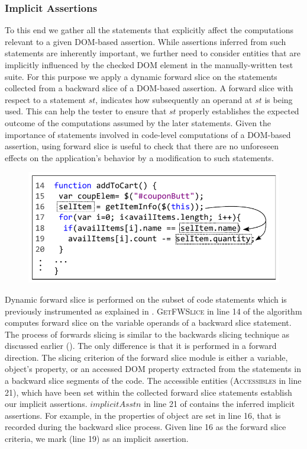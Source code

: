 \subsubsection{Implicit Assertions} \label{Sec:implicitAssertions}
To this end we gather all the statements that explicitly affect the computations relevant to a given DOM-based assertion. While assertions inferred from such statements are inherently important, we further need to consider entities that are implicitly influenced by the checked DOM element in the manually-written test suite. For this purpose we apply a dynamic forward slice on the statements collected from a backward slice of a DOM-based assertion. A forward slice with respect to a statement $st$,
indicates how subsequently an operand at $st$ is being used. This can help the tester to ensure that $st$ properly establishes the expected outcome of the computations assumed by the later statements. 
Given the importance of statements involved in code-level computations of a DOM-based assertion, using forward slice is useful to check that there are no unforeseen effects on the application's behavior by a modification to such statements. 

\begin{figure}[!t]
  \centering
  \includegraphics[width=1\hsize]{fig/forwardSlicingExample}
  \vspace{-0.1in} 
  \label{Fig:forwardSlicingExample}
  \vspace{-0.1in} 
\end{figure}

Dynamic forward slice is performed on the subset of code statements which is previously instrumented as explained in . 
\textsc{GetFWSlice} in line 14 of the algorithm computes forward slice on the variable operands of a backward slice statement.
The process of forwards slicing is similar to the backwards slicing technique as discussed earlier (). The only difference is that it is performed in a forward direction. The slicing criterion of the forward slice module is either a variable, object's property, or an accessed DOM property extracted from the statements in a backward slice segments of the code. The accessible entities (\textsc{Accessibles} in line 21), which have been set within the collected forward slice statements establish our implicit assertions.
$implicitAsstn$ in line 21 of  contains the inferred implicit assertions.
For example, in  the properties of object  are set in line 16, that is recorded during the backward slice process. Given line 16 as the forward slice criteria, we mark  (line 19) as an implicit assertion.        
